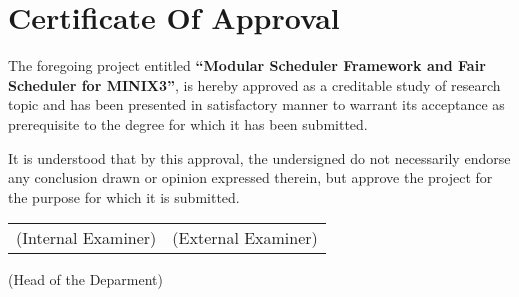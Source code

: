\chapter*{Certificate Of Approval}

The foregoing project  entitled \textbf{``Modular Scheduler Framework and Fair Scheduler  for MINIX3''}, 
is hereby approved as a creditable study of research topic and has been presented in  satisfactory manner to warrant
its acceptance as prerequisite to the degree for which it has been submitted.

It is understood that by this approval, the undersigned do not necessarily endorse any conclusion drawn or
opinion expressed therein, but approve the project for the purpose for which it is submitted.

\vspace{5\baselineskip}

\begin{tabular}{p{} r}
(Internal Examiner) &(External Examiner)
\end{tabular}

\vspace{5\baselineskip}

\begin{center}
(Head of the Deparment)
\end{center}